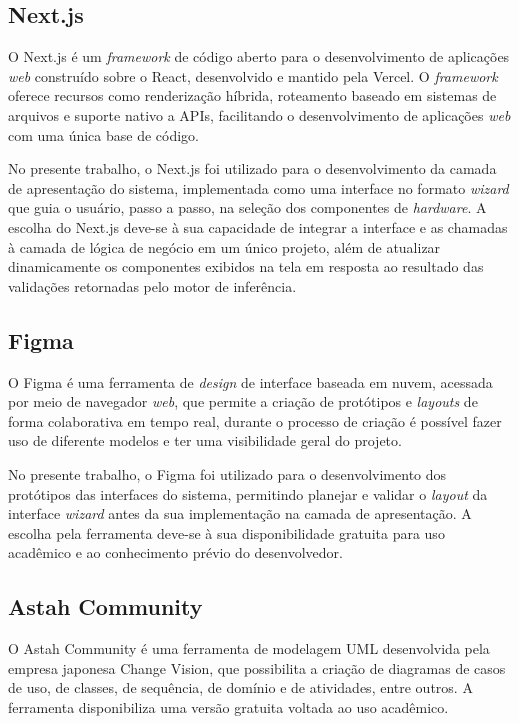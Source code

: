 \subsection{Next.js}
O Next.js é um \textit{framework} de código aberto para o desenvolvimento de aplicações \textit{web} construído sobre o React, desenvolvido
e mantido pela Vercel. O \textit{framework} oferece recursos como renderização híbrida, roteamento baseado em sistemas de arquivos e
suporte nativo a APIs, facilitando o desenvolvimento de aplicações \textit{web} com uma única base de código.

No presente trabalho, o Next.js foi utilizado para o desenvolvimento da camada de apresentação do sistema, implementada como uma interface
no formato \textit{wizard} que guia o usuário, passo a passo, na seleção dos componentes de \textit{hardware}. A escolha do Next.js
deve-se à sua capacidade de integrar a interface e as chamadas à camada de lógica de negócio em um único projeto, além de atualizar
dinamicamente os componentes exibidos na tela em resposta ao resultado das validações retornadas pelo motor de inferência.

\subsection{Figma}
O Figma é uma ferramenta de \textit{design} de interface baseada em nuvem, acessada por meio de navegador \textit{web}, que permite
a criação de protótipos e \textit{layouts} de forma colaborativa em tempo real, durante o processo de criação é possível fazer uso
de diferente modelos e ter uma visibilidade geral do projeto.

No presente trabalho, o Figma foi utilizado para o desenvolvimento dos protótipos das interfaces do sistema, permitindo planejar e validar
o \textit{layout} da interface \textit{wizard} antes da sua implementação na camada de apresentação. A escolha pela ferramenta deve-se
à sua disponibilidade gratuita para uso acadêmico e ao conhecimento prévio do desenvolvedor.

\subsection{Astah Community}
O Astah Community é uma ferramenta de modelagem UML desenvolvida pela empresa japonesa Change Vision, que possibilita a criação de diagramas
de casos de uso, de classes, de sequência, de domínio e de atividades, entre outros. A ferramenta disponibiliza uma versão gratuita voltada
ao uso acadêmico.

